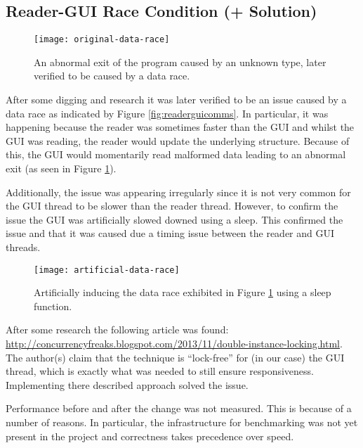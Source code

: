 \documentclass[article]{uom-coursework}
\begin{document}
\subsection{Reader-GUI Race Condition (+ Solution)}

\begin{figure}[H]
\centering
\texttt{[image: original-data-race]}
\caption{An abnormal exit of the program caused by an unknown
type, later verified to be caused by a data race.}
\label{fig:originaldatarace}
\end{figure}

After some digging and research it was later verified to be an
issue caused by a data race as indicated by Figure
\ref{fig:readerguicomms}. In particular, it was happening
because the reader was sometimes faster than the GUI and whilst
the GUI was reading, the reader would update the underlying
structure. Because of this, the GUI would momentarily read
malformed data leading to an abnormal exit (as seen in Figure
\ref{fig:originaldatarace}).

Additionally, the issue was appearing irregularly since it is
not very common for the GUI thread to be slower than the reader
thread. However, to confirm the issue the GUI was artificially
slowed downed using a sleep. This confirmed the issue and that
it was caused due a timing issue between the reader and GUI
threads.

\begin{figure}[H]
\centering
\texttt{[image: artificial-data-race]}
\caption{Artificially inducing the data race exhibited in Figure
\ref{fig:originaldatarace} using a sleep function.}
\label{fig:artificialdatarace}
\end{figure}

After some research the following article was found:
\url{http://concurrencyfreaks.blogspot.com/2013/11/double-instance-locking.html}.
The author(s) claim that the technique is ``lock-free'' for
(in our case) the GUI thread, which is exactly what was needed to
still ensure responsiveness. Implementing there described
approach solved the issue.

\begin{marker}
    Performance before and after the change was not measured.
    This is because of a number of reasons. In particular, the
    infrastructure for benchmarking was not yet present in the
    project and correctness takes precedence over speed.
\end{marker}
\end{document}
